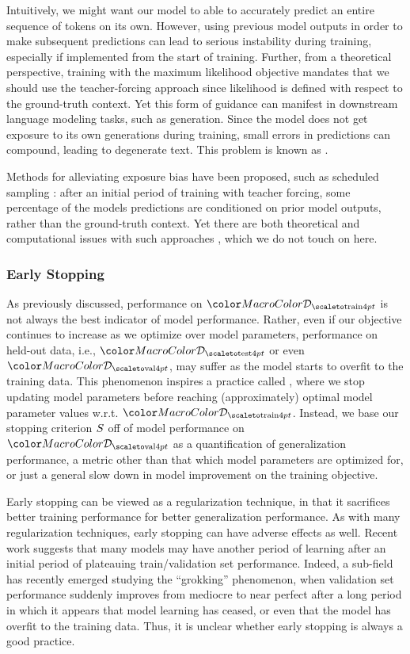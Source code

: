 Intuitively, we might want our model to able to accurately predict an entire sequence of tokens on its own. However, using previous model outputs  in order to make subsequent predictions can lead to serious instability during training, especially if implemented from the start of training. Further, from a theoretical perspective, training with the maximum likelihood objective mandates that we should use the teacher-forcing approach since likelihood is defined with respect to the ground-truth context. 
Yet this form of guidance can manifest in downstream language modeling tasks, such as generation. Since the model does not get exposure to its own generations during training, small errors in predictions can compound, leading to degenerate text. This problem is known as . 

Methods for alleviating exposure bias have been proposed, such as scheduled sampling \cite{bengio_scheduled_sampling}: after an initial period of training with teacher forcing, some percentage of the models predictions are conditioned on prior model outputs, rather than the ground-truth context. Yet there are both theoretical and computational issues with such approaches \cite{huszar_how_2015}, which we do not touch on here.





\subsubsection{Early Stopping}
As previously discussed, performance on $\corpustrain$ is not always the best indicator of model performance. Rather, even if our  objective continues to increase as we optimize over model parameters, performance on held-out data, i.e., $\corpustest$ or even $\corpusval$, may suffer as the model starts to overfit to the training data. This phenomenon inspires a practice called , where we stop updating model parameters before reaching  (approximately) optimal model parameter values w.r.t.  $\corpustrain$. Instead, we base our stopping criterion $S$ off of model performance on $\corpusval$ as a quantification of generalization performance, a metric other than that which model parameters are optimized for, or just a general slow down in model improvement on the training objective. 

Early stopping can be viewed as a regularization technique, in that it sacrifices better training performance for better generalization performance. As with many regularization techniques, early stopping can have adverse effects as well. Recent work suggests that many models may have another period of learning after an initial period of plateauing train/validation set performance. Indeed, a sub-field has recently emerged studying the ``grokking'' phenomenon, when validation set performance suddenly improves from mediocre to near perfect after a long period in which it appears that model learning has ceased, or even that the model has overfit to the training data. Thus, it is unclear whether early stopping is always a good practice.



